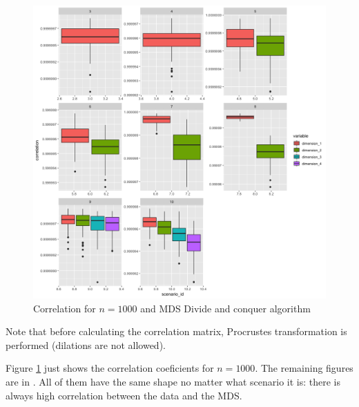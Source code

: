 \documentclass[11pt]{report}
\begin{document}
\begin{figure}[ht]
\centering
    \includegraphics{./images/divide_correlation_1000.png}
    \caption{Correlation for $n = 1000$ and MDS Divide and conquer algorithm}
    \label{divide_correlation_1000}
\end{figure}

\indent Note that before calculating the correlation matrix, Procrustes 
transformation is performed (dilations are not allowed). 

\indent Figure \ref{divide_correlation_1000} just shows the correlation
coeficients for $n = 1000$. The remaining figures are in 
. All of them have the same shape no matter what
scenario it is: there is always high correlation between the data 
and the MDS.
\end{document}
